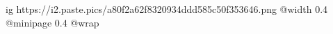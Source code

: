  
 
 
 
 

\ifcmt
  ig https://i2.paste.pics/a80f2a62f8320934ddd585c50f353646.png
  @width 0.4
  @minipage 0.4
  @wrap \parpic[r]
\fi
